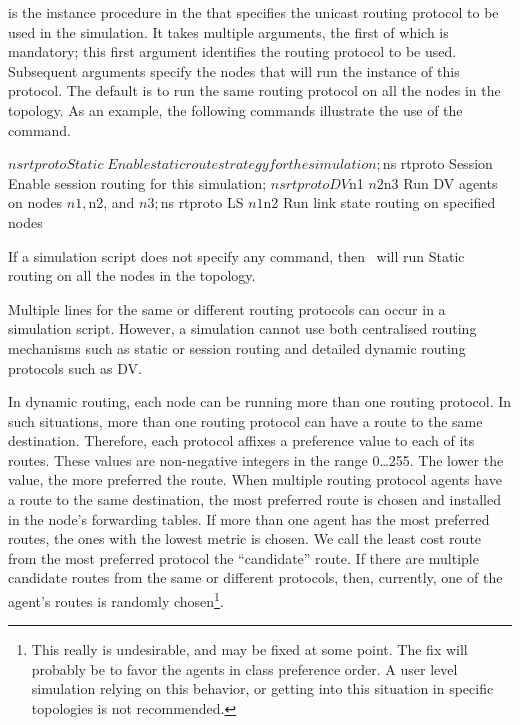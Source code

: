 is the instance procedure in the 
that specifies the unicast routing protocol to be used in the simulation.
It takes multiple arguments, the first of which is mandatory;
this first argument identifies the routing protocol to be used.
Subsequent arguments specify the nodes
that will run the instance of this protocol.
The default is to run the same routing protocol
on all the nodes in the topology.
As an example, the following commands illustrate the use of the
 command.
\begin{program}
        $ns rtproto Static            \; Enable static route strategy for the simulation;
        $ns rtproto Session           \; Enable session routing for this simulation;
        $ns rtproto DV $n1 $n2 $n3    \; Run DV agents on nodes $n1, $n2, and $n3;
        $ns rtproto LS $n1 $n2        \; Run link state routing on specified nodes
\end{program}
If a simulation script does not specify any  command,
then \ns\ will run Static routing on all the nodes in the topology.

Multiple  lines for the same or different routing 
protocols can occur in a simulation script.
However, a simulation cannot use both
centralised routing mechanisms such as static or session routing and 
detailed dynamic routing protocols such as DV.

In dynamic routing, each node can be running more than one routing protocol.
In such situations, more than one routing protocol can have a route to the
same destination.
Therefore, each protocol affixes a preference value to each of its routes.
These values are non-negative integers in the range 0\ldots255.
The lower the value, the more preferred the route.
When multiple routing protocol agents have a route to the same destination,
the most preferred route is chosen and
installed in the node's forwarding tables.
If more than one agent has the most preferred routes,
the ones with the lowest metric is chosen.
We call the least cost route from the most preferred protocol the
``candidate'' route.
If there are multiple candidate routes from the same or different protocols,
then, currently,
one of the agent's routes is randomly chosen\footnote{
This really is undesirable, and may be fixed at some point.
The fix will probably be to favor the agents in class preference order.
A user level simulation relying on this behavior,
or getting into this situation in specific topologies is
not recommended.}.

